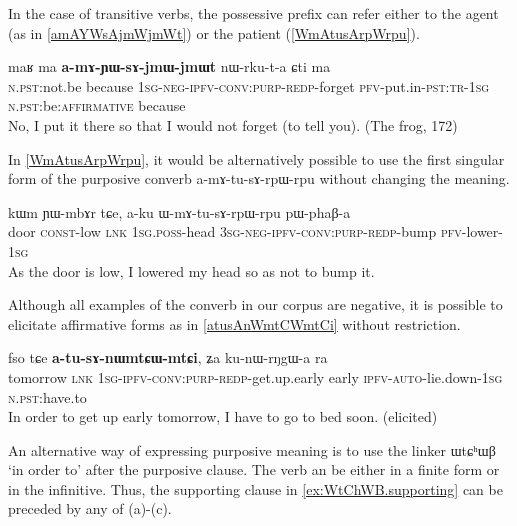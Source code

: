 \documentclass[oldfontcommands,oneside,a4paper,11pt]{article}
\newcommand{\ipa}[1]{{\phon \mbox{#1}}} %
\begin{document}
In the case of transitive verbs, the possessive prefix can refer either to the agent (as in \ref{amAYWsAjmWjmWt}) or the patient (\ref{WmAtusArpWrpu}).

\begin{exe}
\ex \label{amAYWsAjmWjmWt}
\gll 
\ipa{maʁ}   	\ipa{ma}   	\ipa{\textbf{a-mɤ-ɲɯ-sɤ-jmɯ-jmɯt}}   	\ipa{nɯ-rku-t-a}   	\ipa{ɕti}   	\ipa{ma}   \\
\textsc{n.pst}:not.be because \textsc{1sg-neg-ipfv-conv:purp-redp}-forget \textsc{pfv}-put.in-\textsc{pst:tr-1sg} \textsc{n.pst}:be:\textsc{affirmative} because \\
\glt No, I put it there so that I would not forget (to tell you). (The frog, 172)
\end{exe}

In \ref{WmAtusArpWrpu}, it would be alternatively possible to use the first singular form of the purposive converb \ipa{a-mɤ-tu-sɤ-rpɯ-rpu}   without changing the meaning.

 \begin{exe}
\ex \label{WmAtusArpWrpu}
\gll 
\ipa{kɯm}    	\ipa{ɲɯ-mbɤr}    	\ipa{tɕe,}    	\ipa{a-ku}    	\ipa{ɯ-mɤ-tu-sɤ-rpɯ-rpu}    	\ipa{pɯ-phaβ-a}    \\
door \textsc{const}-low \textsc{lnk} \textsc{1sg.poss}-head \textsc{3sg-neg-ipfv-conv:purp-redp}-bump \textsc{pfv}-lower-\textsc{1sg}\\
\glt As the door is low, I lowered my head so as not to bump it.
\end{exe}

Although all examples of the converb in our corpus are negative, it is possible to elicitate affirmative forms  as in \ref{atusAnWmtCWmtCi} without restriction.

\begin{exe}
\ex \label{atusAnWmtCWmtCi}
\gll
 \ipa{fso}   	\ipa{tɕe}   	\ipa{\textbf{a-tu-sɤ-nɯmtɕɯ-mtɕi},}   	\ipa{ʑa}   	\ipa{ku-nɯ-rŋgɯ-a}   	\ipa{ra}  \\
tomorrow \textsc{lnk} \textsc{1sg-ipfv-conv:purp-redp}-get.up.early early \textsc{ipfv-auto}-lie.down-\textsc{1sg} \textsc{n.pst}:have.to 
\\
\glt In order to get up early tomorrow, I have to go to bed soon. (elicited) 
\end{exe}

 An alternative way of expressing purposive meaning is to use the linker \ipa{ɯtɕʰɯβ} `in order to'  after the purposive clause. The verb  an be either in a finite form or in the infinitive.  Thus, the supporting clause in \ref{ex:WtChWB.supporting}  can be preceded by any of  (a)-(c).  
 
\end{document}
